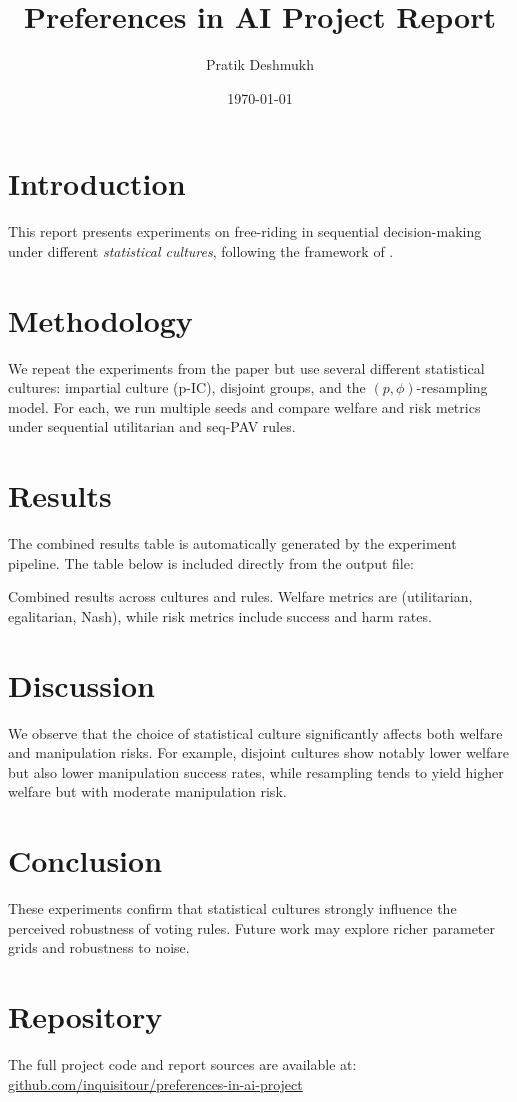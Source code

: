 \documentclass[11pt]{article}
\title{Preferences in AI Project Report}
\author{Pratik Deshmukh}
\date{\today}
\begin{document}
\maketitle

\section{Introduction}
This report presents experiments on free-riding in sequential decision-making
under different \emph{statistical cultures}, following the framework of
\cite{nardi2022}.

\section{Methodology}
We repeat the experiments from the paper but use several different statistical
cultures: impartial culture (p-IC), disjoint groups, and the $(p, \phi)$-resampling
model. For each, we run multiple seeds and compare welfare and risk metrics under
sequential utilitarian and seq-PAV rules.

\section{Results}
The combined results table is automatically generated by the experiment
pipeline. The table below is included directly from the output file:

\begin{table}[h!]
\centering
\resizebox{\textwidth}{!}{%

}
\caption{Combined results across cultures and rules. Welfare metrics are
(utilitarian, egalitarian, Nash), while risk metrics include success and harm
rates.}
\label{tab:combined}
\end{table}

\section{Discussion}
We observe that the choice of statistical culture significantly affects both
welfare and manipulation risks. For example, disjoint cultures show notably
lower welfare but also lower manipulation success rates, while resampling tends
to yield higher welfare but with moderate manipulation risk.

\section{Conclusion}
These experiments confirm that statistical cultures strongly influence the
perceived robustness of voting rules. Future work may explore richer parameter
grids and robustness to noise.




\section*{Repository}
The full project code and report sources are available at: \\
\href{https://github.com/inquisitour/preferences-in-ai-project}{github.com/inquisitour/preferences-in-ai-project}
\end{document}
